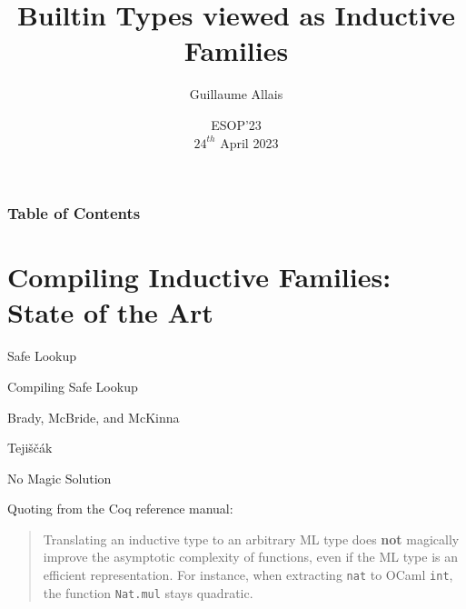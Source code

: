 \documentclass{beamer}
\title{Builtin Types viewed as Inductive Families}
\author{Guillaume Allais}
\institute{University of Strathclyde \\ Glasgow, UK}
\date{ESOP'23 \\ $24^{th}$ April 2023}
\begin{document}
\begin{frame}
  \maketitle
\end{frame}

\begin{frame}
  \frametitle{Table of Contents}
  \tableofcontents
\end{frame}

\section{Compiling Inductive Families: State of the Art}

\begin{frame}{Safe Lookup}


\end{frame}

\begin{frame}{Compiling Safe Lookup}

Brady, McBride, and McKinna~\cite{DBLP:conf/types/BradyMM03}


\vfill

Tejiščák~\cite{DBLP:journals/pacmpl/Tejiscak20}

\end{frame}

\begin{frame}{No Magic Solution}

Quoting from the Coq reference manual:\bigskip

\begin{quote}
Translating an inductive type to an arbitrary ML type
does \textbf{not} magically improve the asymptotic complexity of
functions, even if the ML type is an efficient representation.
For instance, when extracting \texttt{nat} to OCaml \texttt{int}, the
function \texttt{Nat.mul} stays quadratic.
\end{quote}
\end{frame}

\end{document}
